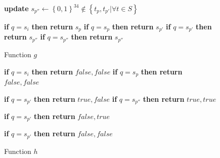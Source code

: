 \documentclass{llncs} %
\begin{document}
\begin{figure}[!tbp]
  \centering
  \begin{minipage}[b]{0.44\textwidth}
    \begin{algorithmic}

    			\State \textbf{update} $ s_{p''} \leftarrow \left\lbrace 0,1\right\rbrace^{34} \notin  \left\lbrace t_p,t_{p'}\vert \forall t \in S \right\rbrace$    	
			\EndIf
	
		\State \textbf{if} {$q = s_{i}$} \textbf{then return} $s_{p}$
    	\State \textbf{if} {$q = s_{p}$} \textbf{then return} $s_{p'}$ 
  	  	\State \textbf{if} {$q = s_{p'}$} \textbf{then return} $s_{p''}$ 
    	\State \textbf{if} {$q = s_{p''}$} \textbf{then return} $s_{p''}$ 
		\EndFunction
	 \caption{Function $g$}
	 \label{func:g}
	\end{algorithmic}
  \end{minipage}
  \hfill
  \begin{minipage}[b]{0.55\textwidth}
    \begin{algorithmic}

			\State \textbf{if} $q = s_{i}$ \textbf{then return } $false, false$ 
			\State \textbf{if} $q = s_{p}$ \textbf{then return } $false, false$ 

    			\State \textbf{if} $q = s_{p'}$ \textbf{then return } $true, false$ 
    			\State \textbf{if} {$q = s_{p''}$} \textbf{then return} $true, true$
			\EndIf

    			\State \textbf{if} $q = s_{p'}$ \textbf{then return } $false, true$ 
			\EndIf
	
    			\State \textbf{if} $q = s_{p'}$ \textbf{then return } $false, false$ 
			\EndIf
		
		\EndFunction
	\caption{Function $h$}
	\label{func:h}
	\end{algorithmic}
  \end{minipage}
\end{figure}
\end{document}
